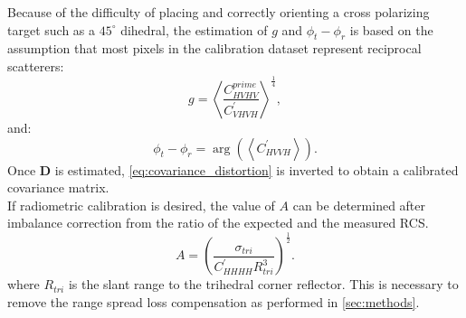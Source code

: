 Because of the difficulty of placing and correctly orienting a cross polarizing target such as a $45^\circ$ dihedral, the estimation of $g$ and $\phi_t - \phi_r$ is based on the assumption that most pixels in the calibration dataset represent reciprocal scatterers:
\begin{equation}
	g = \left<\frac{C_{HVHV}^{prime}}{C_{VHVH}^{\prime}}\right>^\frac{1}{4},
\end{equation}
and:
\begin{equation}
	\phi_t - \phi_r =\operatorname{arg}\left( \left<C_{HVVH}^{\prime}\right>\right).
\end{equation}
Once $\mathbf{D}$ is estimated, \autoref{eq:covariance_distortion} is inverted to obtain a calibrated covariance matrix.\\
If radiometric calibration is desired, the value of $A$ can be determined after imbalance correction from the ratio of the expected and the measured RCS.
\begin{equation}
	A =	\left(\frac{\sigma_{tri}}{C^{\prime}_{HHHH} R_{tri}^{3}}\right)^\frac{1}{2}.
\end{equation}
where $R_{tri}$ is the slant range to the trihedral corner reflector. This is necessary to remove the range spread loss compensation as performed in \autoref{sec:methods}.
